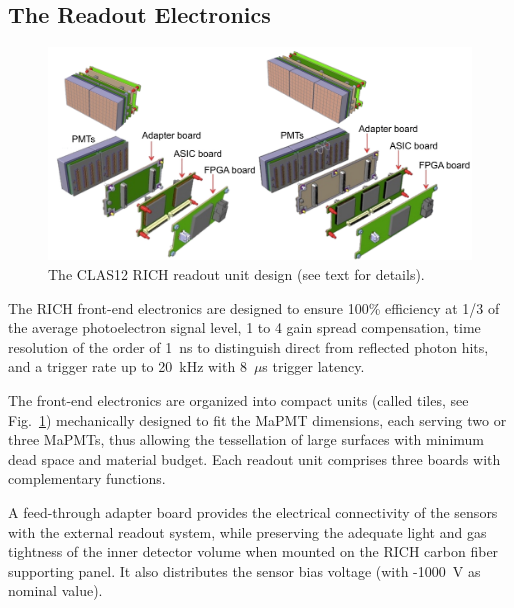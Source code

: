 \documentclass[5p,times,twocolumn]{elsarticle}
\begin{document}
\subsection{The Readout Electronics}

\begin{figure}[t]
\begin{center}
\includegraphics[width=1.00\columnwidth]{TileAssembly.pdf}
\end{center}
\caption{The CLAS12 RICH readout unit design (see text for details).}
\label{fig:EleTile}
\end{figure}

The RICH front-end electronics are designed to ensure 100\% efficiency at 1/3 of the average photoelectron signal
level, 1 to 4 gain spread compensation, time resolution of the order of 1~ns to distinguish direct from reflected photon
hits, and a trigger rate up to 20~kHz with 8~$\mu$s trigger latency.

The front-end electronics are organized into compact units (called tiles, see Fig.~\ref{fig:EleTile}) mechanically designed to
fit the MaPMT dimensions, each serving two or three MaPMTs, thus allowing the tessellation of large surfaces with
minimum dead space and material budget. Each readout unit comprises three boards with complementary functions.

A feed-through adapter board provides the electrical connectivity of the sensors with the external readout
system, while preserving the adequate light and gas tightness of the inner detector volume when mounted on the RICH
carbon fiber supporting panel. It also distributes the sensor bias voltage (with -1000~V as nominal value).
\end{document}
